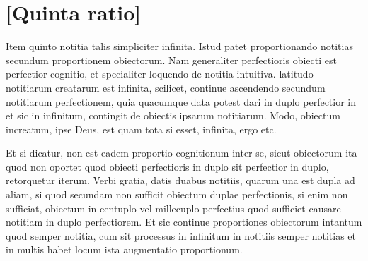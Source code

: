 \documentclass[twoside, openright]{report}
\begin{document}
         \section*{[Quinta ratio]} 
        \pstart
        Item quinto  notitia talis  simpliciter infinita. Istud patet proportionando notitias secundum proportionem obiectorum. Nam generaliter perfectioris obiecti est perfectior cognitio, et specialiter loquendo de  notitia intuitiva.  latitudo notitiarum creatarum est infinita, scilicet, continue ascendendo secundum notitiarum perfectionem, quia quacumque data potest dari in duplo perfectior in  et sic in infinitum,  contingit de obiectis ipsarum notitiarum. Modo, obiectum increatum,  ipse Deus, est  quam tota     si esset,  infinita, ergo etc.
        \pend
     
        \pstart
        Et si dicatur,  non est eadem proportio cognitionum inter se, sicut obiectorum ita quod non  oportet quod obiecti perfectioris  in duplo sit  perfectior in duplo, retorquetur  iterum. Verbi gratia, datis duabus notitiis, quarum una est dupla ad aliam, si  quod  secundam non sufficit obiectum duplae perfectionis, si enim non sufficiat,  obiectum in centuplo vel millecuplo perfectius quod sufficiet causare notitiam in duplo perfectiorem. Et sic  continue proportiones obiectorum intantum quod semper  notitia, cum sit processus in infinitum in  notitiis  semper  notitias et in multis habet locum ista augmentatio proportionum.
        \pend
      
\end{document}
